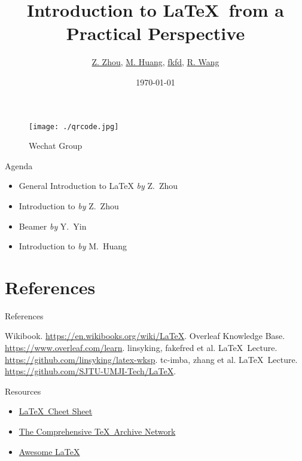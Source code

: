 \documentclass[aspectratio=169]{beamer}
\title{Introduction to \LaTeX\  from a Practical Perspective}
\author{\hyperlink{https://github.com/TechJI-2023/latex_wksp}{Z. Zhou}, \hyperlink{https://github.com/evs000}{M. Huang}, \hyperlink{https://github.com/fakefred}{fkfd}, \hyperlink{https://github.com/Hydraallen}{R. Wang}}
\institute{TechJI}
\date{\today}
\newcommand{\packagename}[1]{\structure{\texttt{#1}}}
\begin{document}
\begin{frame}
    \titlepage
    \begin{figure}
        \centering
        \caption*{Wechat Group}
        \texttt{[image: ./qrcode.jpg]}
    \end{figure}
\end{frame}

\begin{frame}{Agenda}
    \begin{itemize}
        \item General Introduction to \LaTeX \hspace*{\fill} \textit{by} Z.~Zhou
        \item Introduction to \packagename{Tikz} \hspace*{\fill} \textit{by} Z.~Zhou
        \item Beamer \hspace*{\fill} \textit{by} Y.~Yin
        \item Introduction to \packagename{Bibtex} \hspace*{\fill} \textit{by} M.~Huang
    \end{itemize}
\end{frame}







\section*{References}

\begin{frame}{References}
    \begin{thebibliography}{9}
        Wikibook. \url{https://en.wikibooks.org/wiki/LaTeX}.
        Overleaf Knowledge Base. \url{https://www.overleaf.com/learn}.
        linsyking, fakefred et al. \LaTeX\ Lecture. \url{https://github.com/linsyking/latex-wksp}.
        tc-imba, zhang et al. \LaTeX\ Lecture. \url{https://github.com/SJTU-UMJI-Tech/LaTeX}.
    \end{thebibliography}
\end{frame}

\begin{frame}{Resources}
    \begin{itemize}
        \item \href{https://wch.github.io/latexsheet/}{\LaTeX\  Cheet Sheet}
        \item \href{https://www.ctan.org/}{The Comprehensive \TeX\ Archive Network}
        \item \href{https://github.com/egeerardyn/awesome-LaTeX}{Awesome \LaTeX}
    \end{itemize}
\end{frame}
\end{document}
